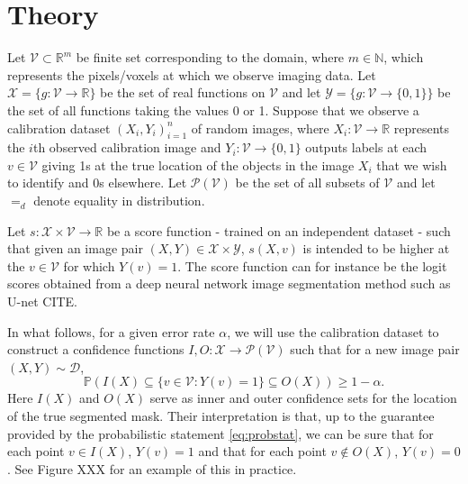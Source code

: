 \section{Theory}
Let $\mathcal{V} \subset \mathbb{R}^m$ be finite set corresponding to the domain, where $m \in \mathbb{N}$, which represents the pixels/voxels at which we observe imaging data. Let $\mathcal{X} = \lbrace g: \mathcal{V} \rightarrow \mathbb{R}\rbrace$ be the set of real functions on $\mathcal{V}$ and let $\mathcal{Y} = \lbrace g: \mathcal{V} \rightarrow \lbrace 0,1 \rbrace \rbrace$ be the set of all functions taking the values 0 or 1. Suppose that we observe a calibration dataset $(X_i, Y_i)_{i = 1}^n$ of random images, where $X_i: \mathcal{V} \rightarrow \mathbb{R}$ represents the $i$th observed calibration image and $Y_i:\mathcal{V} \rightarrow \lbrace 0, 1\rbrace$ outputs labels at each $v \in \mathcal{V}$ giving 1s at the true location of the objects in the image $X_i$ that we wish to identify and 0s elsewhere. Let $\mathcal{P}(\mathcal{V})$ be the set of all subsets of $\mathcal{V}$ and let $=_d$ denote equality in distribution.

Let $s:\mathcal{X} \times \mathcal{V} \rightarrow \mathbb{R}$ be a score function - trained on an independent dataset - such that given an image pair $(X,Y) \in \mathcal{X}\times \mathcal{Y}$, $s(X, v)$ is intended to be higher at the $v \in \mathcal{V}$ for which $Y(v) = 1$. The score function can for instance be the logit scores obtained from a deep neural network image segmentation method such as U-net CITE. 

In what follows, for a given error rate $\alpha$, we will use the calibration dataset to construct a confidence functions $I,O:  \mathcal{X}  \rightarrow \mathcal{P}(\mathcal{V})$ such that for a new image pair $(X,Y) \sim \mathcal{D}$,
\begin{equation}\label{eq:probstat}
	\mathbb{P}\left( I(X) \subseteq \lbrace v\in \mathcal{V}: Y(v) = 1 \rbrace \subseteq O(X) \right) \geq 1 - \alpha.
\end{equation}
Here $I(X)$ and $O(X)$ serve as inner and outer confidence sets for the location of the true segmented mask. Their interpretation is that, up to the guarantee provided by the probabilistic statement \eqref{eq:probstat}, we can be sure that for each point $v\in I(X)$, $Y(v) = 1$ and that for each point $v \not\in O(X)$, $Y(v) = 0$. See Figure XXX for an example of this in practice. 
